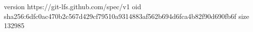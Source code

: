 version https://git-lfs.github.com/spec/v1
oid sha256:6dfc0ac470b2c567d429cf79510a9314883af562b694d6fca4b82f90d690fb6f
size 132985
